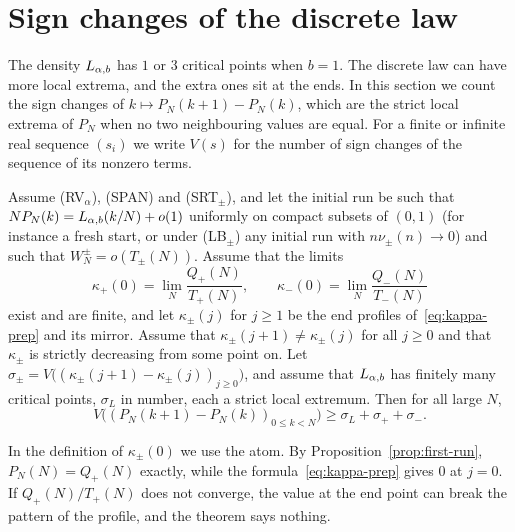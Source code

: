 \section{Sign changes of the discrete law}\label{sec:signs}

The density $L_{\alpha,b}$ has $1$ or $3$ critical points when $b=1$. The discrete law can have
more local extrema, and the extra ones sit at the ends. In this section we count the
sign changes of $k\mapsto P_N(k+1)-P_N(k)$, which are the strict local extrema of $P_N$
when no two neighbouring values are equal. For a finite or infinite real sequence
$(s_i)$ we write $V(s)$ for the number of sign changes of the sequence of its nonzero
terms.

\begin{introtheorem}\label{thm:signs}
Assume (RV$_\alpha$), (SPAN) and (SRT$_\pm$), and let the initial run be such that
$NP_N(k)=L_{\alpha,b}(k/N)+o(1)$ uniformly on compact subsets of $(0,1)$ (for instance a fresh
start, or under (LB$_\pm$) any initial run with $n\nu_\pm(n)\to0$) and such that
$W^\pm_N=o(T_\pm(N))$. Assume that the limits
\[
 \kappa_\plus(0)=\lim_N\frac{Q_\plus(N)}{T_\plus(N)},\qquad \kappa_\minus(0)=\lim_N\frac{Q_\minus(N)}{T_\minus(N)}
\]
exist and are finite, and let $\kappa_\pm(j)$ for $j\ge1$ be the end profiles
of~\eqref{eq:kappa-prep} and its mirror. Assume that $\kappa_\pm(j+1)\ne\kappa_\pm(j)$ for
all $j\ge0$ and that $\kappa_\pm$ is strictly decreasing from some point on. Let
$\sigma_\pm=V\bigl((\kappa_\pm(j+1)-\kappa_\pm(j))_{j\ge0}\bigr)$, and assume that $L_{\alpha,b}$ has
finitely many critical points, $\sigma_L$ in number, each a strict local extremum. Then for
all large $N$,
\[
 V\bigl((P_N(k+1)-P_N(k))_{0\le k<N}\bigr)\ge\sigma_L+\sigma_\plus+\sigma_\minus .
\]
\end{introtheorem}

In the definition of $\kappa_\pm(0)$ we use the atom. By Proposition~\ref{prop:first-run},
$P_N(N)=Q_\plus(N)$ exactly, while the formula~\eqref{eq:kappa-prep} gives $0$ at $j=0$. If
$Q_\plus(N)/T_\plus(N)$ does not converge, the value at the end point can break the
pattern of the profile, and the theorem says nothing.

